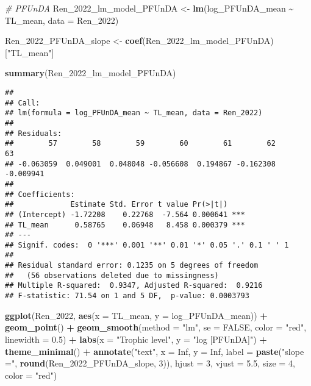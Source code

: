 \documentclass[
]{article}
\newenvironment{Shaded}{\begin{snugshade}}{\end{snugshade}}
\newcommand{\AttributeTok}[1]{\textcolor[rgb]{0.13,0.29,0.53}{#1}}
\newcommand{\CommentTok}[1]{\textcolor[rgb]{0.56,0.35,0.01}{\textit{#1}}}
\newcommand{\ConstantTok}[1]{\textcolor[rgb]{0.56,0.35,0.01}{#1}}
\newcommand{\DecValTok}[1]{\textcolor[rgb]{0.00,0.00,0.81}{#1}}
\newcommand{\FloatTok}[1]{\textcolor[rgb]{0.00,0.00,0.81}{#1}}
\newcommand{\FunctionTok}[1]{\textcolor[rgb]{0.13,0.29,0.53}{\textbf{#1}}}
\newcommand{\NormalTok}[1]{#1}
\newcommand{\OtherTok}[1]{\textcolor[rgb]{0.56,0.35,0.01}{#1}}
\newcommand{\SpecialCharTok}[1]{\textcolor[rgb]{0.81,0.36,0.00}{\textbf{#1}}}
\newcommand{\StringTok}[1]{\textcolor[rgb]{0.31,0.60,0.02}{#1}}
\begin{document}
\begin{Shaded}
\begin{Highlighting}[]
\CommentTok{\# PFUnDA}
\NormalTok{Ren\_2022\_lm\_model\_PFUnDA }\OtherTok{\textless{}{-}} \FunctionTok{lm}\NormalTok{(log\_PFUnDA\_mean }\SpecialCharTok{\textasciitilde{}}\NormalTok{ TL\_mean,}
                              \AttributeTok{data =}\NormalTok{ Ren\_2022)}

\NormalTok{Ren\_2022\_PFUnDA\_slope }\OtherTok{\textless{}{-}} \FunctionTok{coef}\NormalTok{(Ren\_2022\_lm\_model\_PFUnDA)[}\StringTok{"TL\_mean"}\NormalTok{]}

\FunctionTok{summary}\NormalTok{(Ren\_2022\_lm\_model\_PFUnDA)}
\end{Highlighting}
\end{Shaded}

\begin{verbatim}
## 
## Call:
## lm(formula = log_PFUnDA_mean ~ TL_mean, data = Ren_2022)
## 
## Residuals:
##        57        58        59        60        61        62        63 
## -0.063059  0.049001  0.048048 -0.056608  0.194867 -0.162308 -0.009941 
## 
## Coefficients:
##             Estimate Std. Error t value Pr(>|t|)    
## (Intercept) -1.72208    0.22768  -7.564 0.000641 ***
## TL_mean      0.58765    0.06948   8.458 0.000379 ***
## ---
## Signif. codes:  0 '***' 0.001 '**' 0.01 '*' 0.05 '.' 0.1 ' ' 1
## 
## Residual standard error: 0.1235 on 5 degrees of freedom
##   (56 observations deleted due to missingness)
## Multiple R-squared:  0.9347, Adjusted R-squared:  0.9216 
## F-statistic: 71.54 on 1 and 5 DF,  p-value: 0.0003793
\end{verbatim}

\begin{Shaded}
\begin{Highlighting}[]
\FunctionTok{ggplot}\NormalTok{(Ren\_2022, }\FunctionTok{aes}\NormalTok{(}\AttributeTok{x =}\NormalTok{ TL\_mean, }\AttributeTok{y =}\NormalTok{ log\_PFUnDA\_mean)) }\SpecialCharTok{+}
  \FunctionTok{geom\_point}\NormalTok{() }\SpecialCharTok{+}
  \FunctionTok{geom\_smooth}\NormalTok{(}\AttributeTok{method =} \StringTok{"lm"}\NormalTok{, }\AttributeTok{se =} \ConstantTok{FALSE}\NormalTok{, }\AttributeTok{color =} \StringTok{"red"}\NormalTok{, }\AttributeTok{linewidth =} \FloatTok{0.5}\NormalTok{) }\SpecialCharTok{+}
  \FunctionTok{labs}\NormalTok{(}\AttributeTok{x =} \StringTok{"Trophic level"}\NormalTok{,}
       \AttributeTok{y =} \StringTok{"log [PFUnDA]"}\NormalTok{) }\SpecialCharTok{+}
  \FunctionTok{theme\_minimal}\NormalTok{() }\SpecialCharTok{+}
  \FunctionTok{annotate}\NormalTok{(}\StringTok{"text"}\NormalTok{, }\AttributeTok{x =} \ConstantTok{Inf}\NormalTok{, }\AttributeTok{y =} \ConstantTok{Inf}\NormalTok{, }\AttributeTok{label =} \FunctionTok{paste}\NormalTok{(}\StringTok{"slope ="}\NormalTok{, }\FunctionTok{round}\NormalTok{(Ren\_2022\_PFUnDA\_slope, }\DecValTok{3}\NormalTok{)), }
           \AttributeTok{hjust =} \DecValTok{3}\NormalTok{, }\AttributeTok{vjust =} \FloatTok{5.5}\NormalTok{, }\AttributeTok{size =} \DecValTok{4}\NormalTok{, }\AttributeTok{color =} \StringTok{"red"}\NormalTok{)}
\end{Highlighting}
\end{Shaded}
\end{document}

